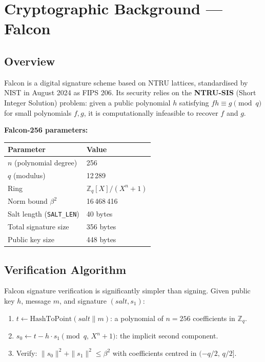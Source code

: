 \documentclass[11pt,a4paper]{article}
\begin{document}
\section{Cryptographic Background --- Falcon}

\subsection{Overview}

Falcon is a digital signature scheme based on NTRU lattices, standardised
by NIST in August 2024 as FIPS 206.
Its security relies on the \textbf{NTRU-SIS} (Short Integer Solution) problem:
given a public polynomial $h$ satisfying $fh \equiv g \pmod{q}$ for small
polynomials $f, g$, it is computationally infeasible to recover $f$ and $g$.

\textbf{Falcon-256 parameters:}
\begin{center}
\begin{tabular}{ll}
\toprule
Parameter & Value \\
\midrule
$n$ (polynomial degree)           & 256 \\
$q$ (modulus)                     & 12\,289 \\
Ring                              & $\mathbb{Z}_q[X]/(X^n+1)$ \\
Norm bound $\beta^2$              & 16\,468\,416 \\
Salt length (\texttt{SALT\_LEN})  & 40 bytes \\
Total signature size              & 356 bytes \\
Public key size                   & 448 bytes \\
\bottomrule
\end{tabular}
\end{center}

\subsection{Verification Algorithm}

Falcon signature verification is significantly simpler than signing.
Given public key $h$, message $m$, and signature $(salt, s_1)$:

\begin{enumerate}
  \item $t \leftarrow \mathrm{HashToPoint}(salt \| m)$: a polynomial of
        $n=256$ coefficients in $\mathbb{Z}_q$.
  \item $s_0 \leftarrow t - h \cdot s_1 \pmod{q,\, X^n+1}$:
        the implicit second component.
  \item Verify: $\|s_0\|^2 + \|s_1\|^2 \leq \beta^2$
        with coefficients centred in $(-q/2,\,q/2]$.
\end{enumerate}
\end{document}
